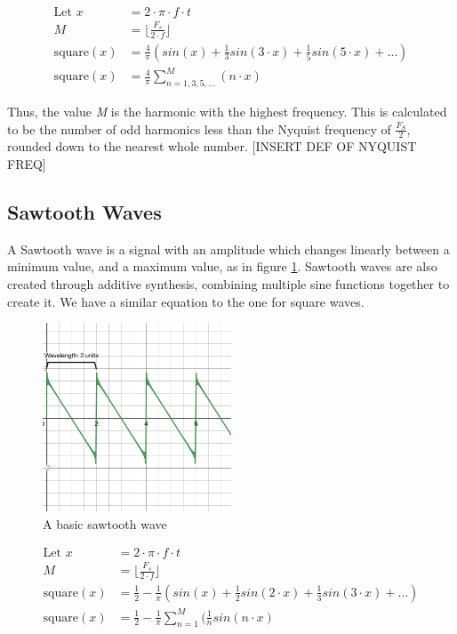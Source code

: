 \begin{align}
    \textrm{Let } x &= 2 \cdot \pi \cdot f \cdot t \\
    M &= \bigg \lfloor \frac{F_s}{2 \cdot f} \bigg \rfloor \\
    \textrm{square}(x) &= \frac{4}{\pi}(sin(x) + \frac{1}{3}sin(3 \cdot x) + \frac{1}{5}sin(5 \cdot x) + \dots) \\
    \textrm{square}(x) &= \frac{4}{\pi}\sum_{n=1, 3, 5, \dots}^{M}(n \cdot x)
\end{align}

Thus, the value \textit{M} is the harmonic with the highest frequency. This is calculated to be the number of odd harmonics less than the Nyquist frequency of $\frac{F_S}{2}$, rounded down to the nearest whole number. [INSERT DEF OF NYQUIST FREQ]

\subsection{Sawtooth Waves}
A Sawtooth wave is a signal with an amplitude which changes linearly between a minimum value, and a maximum value, as in figure \ref{fig:basic-sawtooth-wave}. Sawtooth waves are also created through additive synthesis, combining multiple sine functions together to create it. We have a similar equation to the one for square waves. 

\begin{figure}
  \centering
  \includegraphics[width=0.5\textwidth]{figures/sawtooth-wave.png}
  \caption{A basic sawtooth wave}
  \label{fig:basic-sawtooth-wave}
\end{figure}


\begin{align}
    \textrm{Let } x &= 2 \cdot \pi \cdot f \cdot t \\
    M &= \bigg \lfloor \frac{F_s}{2 \cdot f} \bigg \rfloor \\
    \textrm{square}(x) &= \frac{1}{2} - \frac{1}{\pi}(sin(x) + \frac{1}{2}sin(2 \cdot x) + \frac{1}{3}sin(3 \cdot x) + \dots) \\
    \textrm{square}(x) &= \frac{1}{2} - \frac{1}{\pi}\sum_{n=1}^{M}(\frac{1}{n}sin(n \cdot x)
\end{align}

